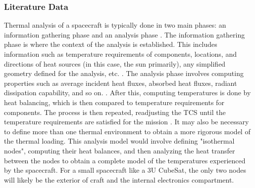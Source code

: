 \subsubsection{Literature Data}
Thermal analysis of a spacecraft is typically done in two main phases: an information gathering phase and an analysis phase \cite{SMAD}. The information gathering phase is where the context of the analysis is established. This includes information such as temperature requirements of components, locations, and directions of heat sources (in this case, the sun primarily), any simplified geometry defined for the analysis, etc. \cite{SMAD}. The analysis phase involves computing properties such as average incident heat fluxes, absorbed heat fluxes, radiant dissipation capability, and so on. \cite{SMAD}. After this, computing temperatures is done by heat balancing, which is then compared to temperature requirements for components. The process is then repeated, readjusting the TCS until the temperature requirements are satisfied for the mission \cite{SMAD}. It may also be necessary to define more than one thermal environment to obtain a more rigorous model of the thermal loading. This analysis model would involve defining "isothermal nodes", computing their heat balances, and then analyzing the heat transfer between the nodes to obtain a complete model of the temperatures experienced by the spacecraft. For a small spacecraft like a 3U CubeSat, the only two nodes will likely be the exterior of craft and the internal electronics compartment.
